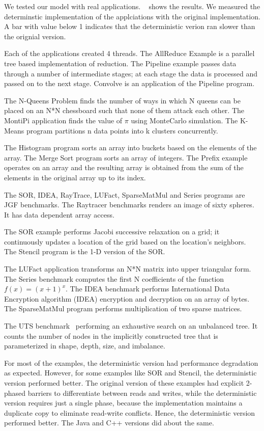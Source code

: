 \documentclass[10pt, conference, compsocconf]{IEEEtran}
\begin{document}
We tested our model with real applications.
~
shows the results. We measured the determinstic implementation of the applciations
with the original implementation. A bar with value below 1 indicates that the deterministic
verion ran slower than the orignial version. 

Each of the applications created
4 threads.
The AllReduce Example is a parallel tree based implementation of reduction.
The Pipeline example passes data through a number of intermediate stages; at each
stage the data is processed and passed on to the next stage. Convolve is an
application of the Pipeline program.

The N-Queens Problem finds the number of ways in which N queens can be placed
on an N*N chessboard such that none of them attack each other. The MontiPi application
finds the value of $\pi$ using MonteCarlo simulation. The K-Means program partitions
n data points into k clusters concurrently.

The Histogram program sorts an array into buckets based on the elements of the array.
The Merge Sort program sorts an array of integers.
The Prefix example operates on an array and the resulting array is obtained from the sum
of the elements in the original array up to its index.

The SOR, IDEA, RayTrace, LUFact, SparseMatMul and Series programs are JGF benchmarks.
The Raytracer benchmarks renders an image of sixty spheres. It has data dependent
array access.

The SOR example performs Jacobi successive relaxation
on a grid; it continuously updates a location of the grid based on the location's
neighbors.
The Stencil program is the  1-D version of the SOR.

The LUFact application transforms an N*N matrix into upper triangular form. The Series benchmark
computes the first N coefficients of the function $f(x) = (x+1)^x$. The IDEA benchmark
performs International Data Encryption algorithm  (IDEA) encryption and decryption on an array
of bytes.
The SparseMatMul program performs multiplication of two sparse matrices.


The UTS  benchmark~\cite{olivier2006uts}
performing an exhaustive search on an unbalanced tree.
It  counts the number of
nodes in  the implicitly constructed tree that is parameterized in
 shape, depth, size, and imbalance.

For most of the examples, the deterministic version had  performance degradation
 as expected. However, for some examples like SOR and Stencil, the deterministic
version performed better. The original version of these examples had explicit 2-phased 
barriers to differentiate between reads and writes, while the deterministic
version requires just a single phase, because the implementation maintains
 a duplicate copy 
to eliminate read-write conflicts. Hence, the deterministic
version performed better. The Java and C++ versions did about the same.
\end{document}
